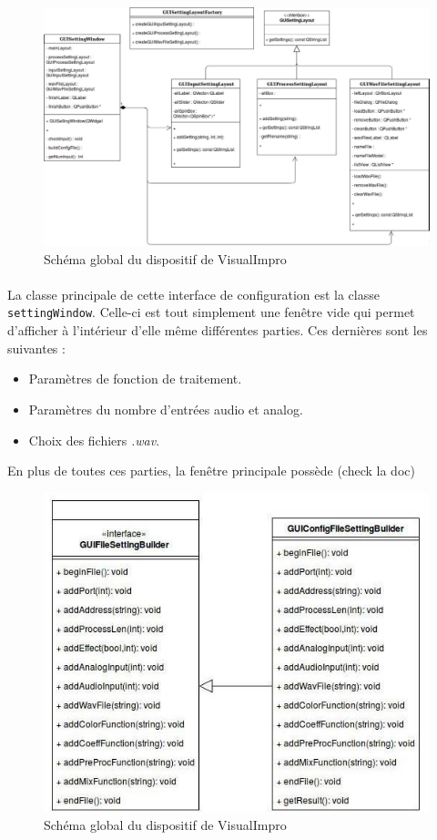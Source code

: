 \begin{figure}[h]
 \centering
 \includegraphics[scale=0.3]{umlSettingWindow.png}
 \caption{Schéma global du dispositif de VisualImpro}
 \label{schéma global}
\end{figure}

\paragraph{}
La classe principale de cette interface de configuration est la
classe \verb!settingWindow!. Celle-ci est tout simplement une fenêtre vide
qui permet d'afficher à l'intérieur d'elle même différentes parties.
Ces dernières sont les suivantes :
\begin{itemize}
 \item Paramètres de fonction de traitement.
 \item Paramètres du nombre d'entrées audio et analog.
 \item Choix des fichiers \textit{.wav}.
\end{itemize}
En plus de toutes ces parties, la fenêtre principale possède (check la doc)

\begin{figure}[h]
 \centering
 \includegraphics[scale=0.5]{umlBuilder.png}
 \caption{Schéma global du dispositif de VisualImpro}
 \label{schéma global}
\end{figure}


